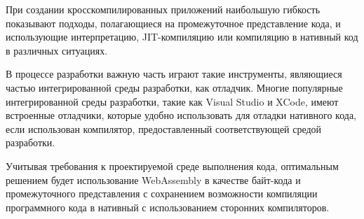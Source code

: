 При создании кросскомпилированных приложений наибольшую гибкость показывают подходы, полагающиеся на промежуточное представление кода, и использующие интерпретацию, JIT-компиляцию или компиляцию в нативный код в различных ситуациях.

В процессе разработки важную часть играют такие инструменты, являющиеся частью интегрированной среды разработки, как отладчик.
Многие популярные интегрированной среды разработки, такие как Visual Studio и XCode, имеют встроенные отладчики, которые удобно использовать для отладки нативного кода, если использован компилятор, предоставленный соответствующей средой разработки.

Учитывая требования к проектируемой среде выполнения кода, оптимальным решением будет использование WebAssembly в качестве байт-кода и промежуточного представления с сохранением возможности компиляции программного кода в нативный с использованием сторонних компиляторов.
